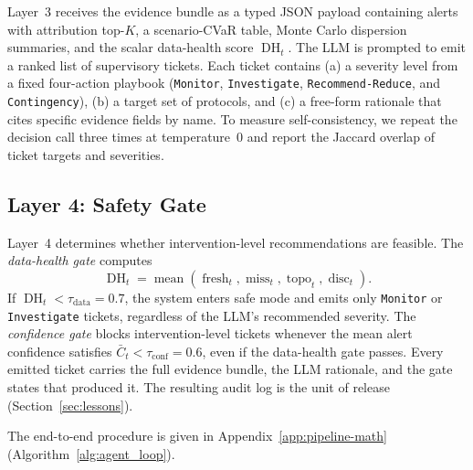 Layer~3 receives the evidence bundle as a typed JSON payload containing
alerts with attribution top-$K$, a scenario-CVaR table, Monte Carlo
dispersion summaries, and the scalar data-health score $\operatorname{DH}_t$.
The LLM is prompted to emit a ranked list of supervisory tickets. Each ticket
contains (a) a severity level from a fixed four-action playbook
(\texttt{Monitor}, \texttt{Investigate}, \texttt{Recommend-Reduce}, and
\texttt{Contingency}), (b) a target set of protocols, and (c) a free-form
rationale that cites specific evidence fields by name. To measure
self-consistency, we repeat the decision call three times at temperature~$0$
and report the Jaccard overlap of ticket targets and severities.

\subsection{Layer 4: Safety Gate}
\label{ssec:gates}

Layer~4 determines whether intervention-level recommendations are feasible.
The \emph{data-health gate} computes
\begin{equation}
\operatorname{DH}_t
=
\operatorname{mean}
\left(
\operatorname{fresh}_t,
\operatorname{miss}_t,
\operatorname{topo}_t,
\operatorname{disc}_t
\right).
\end{equation}
If $\operatorname{DH}_t<\tau_{\mathrm{data}}=0.7$, the system enters safe
mode and emits only \texttt{Monitor} or \texttt{Investigate} tickets,
regardless of the LLM's recommended severity. The \emph{confidence gate}
blocks intervention-level tickets whenever the mean alert confidence
satisfies $\bar{C}_t<\tau_{\mathrm{conf}}=0.6$, even if the data-health gate
passes. Every emitted ticket carries the full evidence bundle, the LLM
rationale, and the gate states that produced it. The resulting audit log is
the unit of release (Section~\ref{sec:lessons}).

\noindent
The end-to-end procedure is given in Appendix~\ref{app:pipeline-math}
(Algorithm~\ref{alg:agent_loop}).
